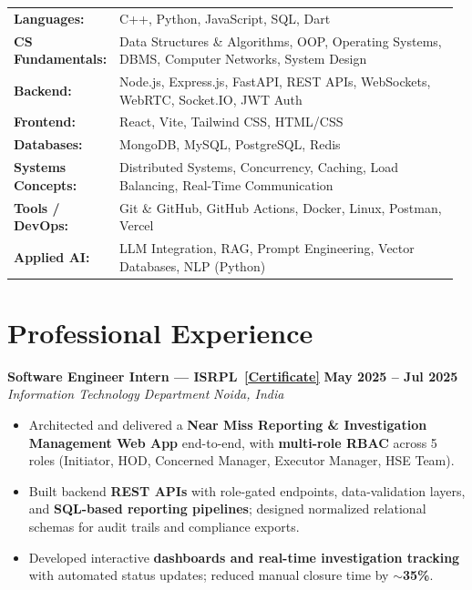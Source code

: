 \documentclass[a4paper,10.5pt]{article}
\newcommand{\resumeSubheading}[4]{%
  \noindent\textbf{\color{accent}#1} \hfill \textbf{\small#2} \\
  \noindent\textit{\small\color{gray}#3} \hfill \textit{\small\color{gray}#4} \vspace{2pt}%
}
\newcommand{\resumeItem}[1]{\item\small #1}
\begin{document}
\begin{tabular}{@{}p{0.20\linewidth} p{0.77\linewidth}@{}}
\textbf{Languages:}        & C++, Python, JavaScript, SQL, Dart \\[2pt]
\textbf{CS Fundamentals:}  & Data Structures \& Algorithms, OOP, Operating Systems, DBMS, Computer Networks, System Design \\[2pt]
\textbf{Backend:}          & Node.js, Express.js, FastAPI, REST APIs, WebSockets, WebRTC, Socket.IO, JWT Auth \\[2pt]
\textbf{Frontend:}         & React, Vite, Tailwind CSS, HTML/CSS \\[2pt]
\textbf{Databases:}        & MongoDB, MySQL, PostgreSQL, Redis \\[2pt]
\textbf{Systems Concepts:} & Distributed Systems, Concurrency, Caching, Load Balancing, Real-Time Communication \\[2pt]
\textbf{Tools / DevOps:}   & Git \& GitHub, GitHub Actions, Docker, Linux, Postman, Vercel \\[2pt]
\textbf{Applied AI:}       & LLM Integration, RAG, Prompt Engineering, Vector Databases, NLP (Python) \\
\end{tabular}

\section*{Professional Experience}

\resumeSubheading
{Software Engineer Intern --- ISRPL \,\href{https://drive.google.com/file/d/18-IPNTV7WDPqWt1JuZBNGiwhsbWZ6-QL/view?usp=sharing}{\small[Certificate]}}{May 2025 -- Jul 2025}
{Information Technology Department}{Noida, India}
\begin{itemize}
  \resumeItem{Architected and delivered a \textbf{Near Miss Reporting \& Investigation Management Web App} end-to-end, with \textbf{multi-role RBAC} across 5 roles (Initiator, HOD, Concerned Manager, Executor Manager, HSE Team).}
  \resumeItem{Built backend \textbf{REST APIs} with role-gated endpoints, data-validation layers, and \textbf{SQL-based reporting pipelines}; designed normalized relational schemas for audit trails and compliance exports.}
  \resumeItem{Developed interactive \textbf{dashboards and real-time investigation tracking} with automated status updates; reduced manual closure time by $\sim$\textbf{35\%}.}
\end{itemize}
\end{document}
